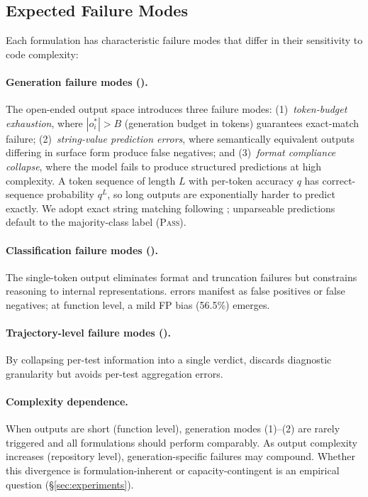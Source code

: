 \subsection{Expected Failure Modes}
\label{sec:failure-modes}

Each formulation has characteristic failure modes that differ in their sensitivity to code complexity:

\paragraph{Generation failure modes (\cwm{}).} The open-ended output space introduces three failure modes: (1)~\emph{token-budget exhaustion}, where $|o_i^*| > B$ (generation budget in tokens) guarantees exact-match failure; (2)~\emph{string-value prediction errors}, where semantically equivalent outputs differing in surface form produce false negatives; and (3)~\emph{format compliance collapse}, where the model fails to produce structured predictions at high complexity. A token sequence of length $L$ with per-token accuracy $q$ has correct-sequence probability $q^L$, so long outputs are exponentially harder to predict exactly. We adopt exact string matching following \citet{meta2025cwm}; unparseable predictions default to the majority-class label (\textsc{Pass}).

\paragraph{Classification failure modes (\cls{}).} The single-token output eliminates format and truncation failures but constrains reasoning to internal representations. \cls{} errors manifest as false positives or false negatives; at function level, a mild FP bias (56.5\%) emerges.

\paragraph{Trajectory-level failure modes (\traj{}).} By collapsing per-test information into a single verdict, \traj{} discards diagnostic granularity but avoids per-test aggregation errors.

\paragraph{Complexity dependence.} When outputs are short (function level), generation modes (1)--(2) are rarely triggered and all formulations should perform comparably. As output complexity increases (repository level), generation-specific failures may compound. Whether this divergence is formulation-inherent or capacity-contingent is an empirical question (\S\ref{sec:experiments}).

